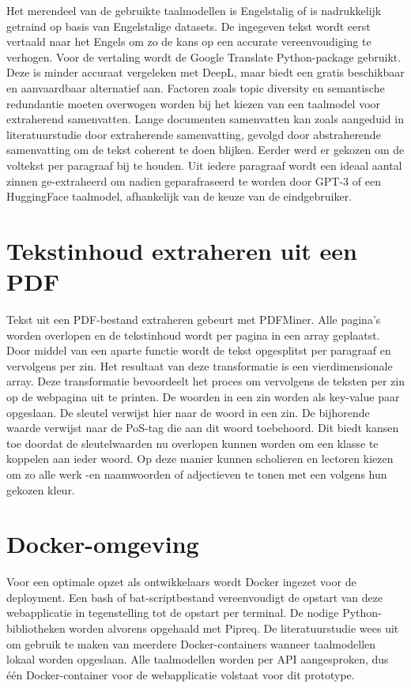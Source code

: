 Het merendeel van de gebruikte taalmodellen is Engelstalig of is nadrukkelijk getraind op basis van Engelstalige datasets. De ingegeven tekst wordt eerst vertaald naar het Engels om zo de kans op een accurate vereenvoudiging te verhogen. Voor de vertaling wordt de Google Translate Python-package gebruikt. Deze is minder accuraat vergeleken met DeepL, maar biedt een gratis beschikbaar en aanvaardbaar alternatief aan. Factoren zoals topic diversity en semantische redundantie moeten overwogen worden bij het kiezen van een taalmodel voor extraherend samenvatten. Lange documenten samenvatten kan zoals aangeduid in literatuurstudie door extraherende samenvatting, gevolgd door abstraherende samenvatting om de tekst coherent te doen blijken. Eerder werd er gekozen om de voltekst per paragraaf bij te houden. Uit iedere paragraaf wordt een ideaal aantal zinnen ge-extraheerd om nadien geparafraseerd te worden door GPT-3 of een HuggingFace taalmodel, afhankelijk van de keuze van de eindgebruiker.

\section{Tekstinhoud extraheren uit een PDF}

Tekst uit een PDF-bestand extraheren gebeurt met PDFMiner. Alle pagina's worden overlopen en de tekstinhoud wordt per pagina in een array geplaatst. Door middel van een aparte functie wordt de tekst opgesplitst per paragraaf en vervolgens per zin. Het resultaat van deze transformatie is een vierdimensionale array. Deze transformatie bevoordeelt het proces om vervolgens de teksten per zin op de webpagina uit te printen. De woorden in een zin worden als key-value paar opgeslaan. De sleutel verwijst hier naar de woord in een zin. De bijhorende waarde verwijst naar de PoS-tag die aan dit woord toebehoord. Dit biedt kansen toe doordat de sleutelwaarden nu overlopen kunnen worden om een klasse te koppelen aan ieder woord. Op deze manier kunnen scholieren en lectoren kiezen om zo alle werk -en naamwoorden of adjectieven te tonen met een volgens hun gekozen kleur.

\section{Docker-omgeving}
Voor een optimale opzet als ontwikkelaars wordt Docker ingezet voor de deployment. Een bash of bat-scriptbestand vereenvoudigt de opstart van deze webapplicatie in tegenstelling tot de opstart per terminal. De nodige Python-bibliotheken worden alvorens opgehaald met Pipreq. De literatuurstudie wees uit om gebruik te maken van meerdere Docker-containers wanneer taalmodellen lokaal worden opgeslaan. Alle taalmodellen worden per API aangesproken, dus één Docker-container voor de webapplicatie volstaat voor dit prototype.

